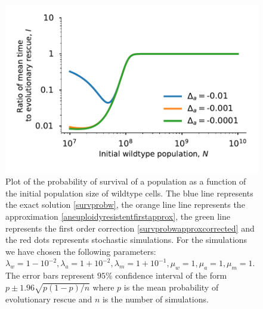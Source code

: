 \documentclass[12pt]{extarticle}
\begin{document}
\begin{figure}[!t]
 \vspace*{1\baselineskip}
\includegraphics[width=1\textwidth]{Figures/MeanTimeRatioInitialPopulationSize.pdf}
\caption{Plot of the probability of survival of a population as a function of the initial population size of wildtype cells. The blue line represents the exact solution \eqref{survprobw}, the orange line line represents the approximation \eqref{aneuploidyresistentfirstapprox}, the green line represents the first order correction \eqref{survprobwapproxcorrected} and the red dots represents stochastic simulations. For the simulations we have chosen the following parameters: $\lambda_w=1-10^{-2}, \lambda_a=1+10^{-2},\lambda_m=1+10^{-1},\mu_w=1,\mu_a=1,\mu_m=1$. The error bars represent $95\%$ confidence interval of the form $p\pm1.96\sqrt{p\left(1-p\right)/n}$ where $p$ is the mean probability of evolutionary rescue and $n$ is the number of simulations.}
\label{MeanTimeRatioInitialPopulationSize}
\end{figure}
\end{document}
